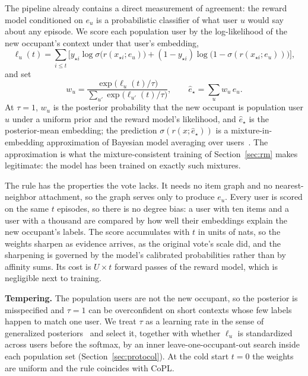 \documentclass[conference]{IEEEtran}
\newcommand{\sigmoid}{\sigma}
\newcommand{\newuser}{\star}
\begin{document}
The pipeline already contains a direct measurement of agreement: the reward model conditioned on $e_u$ is a probabilistic classifier of what user $u$ would say about any episode. We score each population user by the log-likelihood of the new occupant's context under that user's embedding,
\begin{equation}
 \ell_u(t)=\sum_{i\le t}\Big[y_{\newuser i}\log\sigmoid\big(r(x_{\newuser i};e_u)\big)+(1-y_{\newuser i})\log\big(1-\sigmoid(r(x_{\newuser i};e_u))\big)\Big],
 \label{eq:loglik}
\end{equation}
and set
\begin{equation}
 w_u=\frac{\exp\big(\ell_u(t)/\tau\big)}{\sum_{u'}\exp\big(\ell_{u'}(t)/\tau\big)},\qquad
 \hat e_\newuser=\sum_u w_u\,e_u.
 \label{eq:posterior}
\end{equation}
At $\tau=1$, $w_u$ is the posterior probability that the new occupant is population user $u$ under a uniform prior and the reward model's likelihood, and $\hat e_\newuser$ is the posterior-mean embedding; the prediction $\sigmoid(r(x;\hat e_\newuser))$ is a mixture-in-embedding approximation of Bayesian model averaging over users~\cite{hoeting1999bma}. The approximation is what the mixture-consistent training of Section~\ref{sec:rm} makes legitimate: the model has been trained on exactly such mixtures.

The rule has the properties the vote lacks. It needs no item graph and no nearest-neighbor attachment, so the graph serves only to produce $e_u$. Every user is scored on the same $t$ episodes, so there is no degree bias: a user with ten items and a user with a thousand are compared by how well their embeddings explain the new occupant's labels. The score accumulates with $t$ in units of nats, so the weights sharpen as evidence arrives, as the original vote's scale did, and the sharpening is governed by the model's calibrated probabilities rather than by affinity sums. Its cost is $U\times t$ forward passes of the reward model, which is negligible next to training.

\textbf{Tempering.} The population users are not the new occupant, so the posterior is misspecified and $\tau=1$ can be overconfident on short contexts whose few labels happen to match one user. We treat $\tau$ as a learning rate in the sense of generalized posteriors~\cite{bissiri2016general,grunwald2017inconsistency} and select it, together with whether $\ell_u$ is standardized across users before the softmax, by an inner leave-one-occupant-out search inside each population set (Section~\ref{sec:protocol}). At the cold start $t=0$ the weights are uniform and the rule coincides with CoPL.
\end{document}
